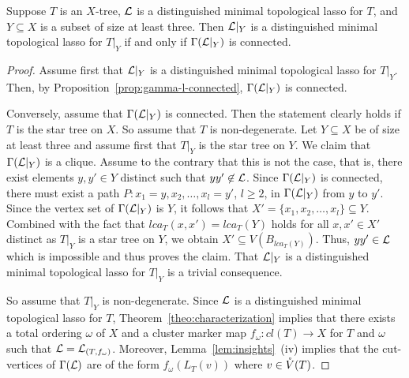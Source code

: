 \begin{thm}
  \label{theo:subtree}
  Suppose $T$ is an $X$-tree, ${\mathcal L}$ is a distinguished minimal topological
  lasso for $T$, and $Y\subseteq X$ is a subset of size at least three. Then
  ${\mathcal L}|_Y$ is a distinguished minimal topological lasso for $T|_Y$ if and only
  if $\Gamma({\mathcal L}|_Y)$ is connected.
\end{thm}
\begin{proof}
  Assume first that ${\mathcal L}|_Y$ is a distinguished minimal topological lasso for
  $T|_Y$. Then, by Proposition~\ref{prop:gamma-l-connected}, $\Gamma({\mathcal L}|_Y)$
  is connected.

  Conversely, assume that $\Gamma({\mathcal L}|_Y)$ is connected. Then the statement
  clearly holds if $T$ is the star tree on $X$. So assume that $T$ is
  non-degenerate. Let $Y\subseteq X$ be of size at least three and assume
  first that $T|_Y$ is the star tree on $Y$. We claim that $\Gamma({\mathcal L}|_Y)$ is
  a clique. Assume to the contrary that this is not the case, that is, there
  exist elements $y,y'\in Y$ distinct such that $yy'\not\in {\mathcal L}$. Since
  $\Gamma({\mathcal L}|_Y)$ is connected, there must exist a path
  $P:x_1=y,x_2,\ldots,x_l=y'$, $l\geq 2$, in $\Gamma({\mathcal L}|_Y)$ from $y$ to
  $y'$. Since the vertex set of $\Gamma({\mathcal L}|_Y)$ is $Y$, it follows that
  $X'=\{x_1,x_2,\ldots,x_l\}\subseteq Y$. Combined with the fact that
  $lca_T(x,x')=lca_T(Y)$ holds for all $x,x'\in X'$ distinct as $T|_Y$ is a
  star tree on $Y$, we obtain $X'\subseteq V(B_{lca_T(Y)})$.  Thus, $yy'\in
  {\mathcal L}$ which is impossible and thus proves the claim.  That ${\mathcal L}|_Y$ is a
  distinguished minimal topological lasso for $T|_Y$ is a trivial consequence.

  So assume that $T|_Y$ is non-degenerate. Since ${\mathcal L}$ is a distinguished
  minimal topological lasso for $T$, Theorem~\ref{theo:characterization}
  implies that there exists a total ordering $\omega$ of $X$ and a cluster
  marker map $f_{\omega}: cl(T)\to X$ for $T$ and $\omega$ such that
  ${\mathcal L}={\mathcal L}_{(T,f_{\omega})}$. Moreover, Lemma~\ref{lem:insights}~(iv) implies
  that the cut-vertices of $\Gamma({\mathcal L})$ are of the form $f_{\omega}(L_T(v))$
  where $v\in \mathring{V}(T)$.


\end{proof}

